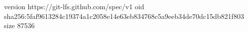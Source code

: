 version https://git-lfs.github.com/spec/v1
oid sha256:5faf9613284c19374a1c2058e14e63eb834768c5a9eeb34de70dc15db821f803
size 87536
